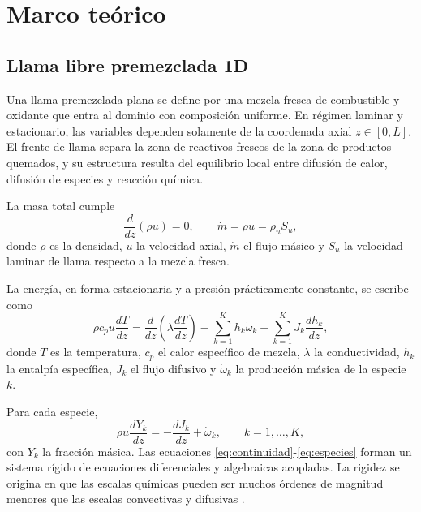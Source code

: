 \documentclass[12pt,a4paper]{article}
\begin{document}
\section{Marco teórico}

\subsection{Llama libre premezclada 1D}

Una llama premezclada plana se define por una mezcla fresca de combustible y oxidante que entra al dominio con composición uniforme. En régimen laminar y estacionario, las variables dependen solamente de la coordenada axial $z\in[0,L]$. El frente de llama separa la zona de reactivos frescos de la zona de productos quemados, y su estructura resulta del equilibrio local entre difusión de calor, difusión de especies y reacción química.

La masa total cumple
\begin{equation}
  \frac{d}{dz}(\rho u)=0,
  \qquad
  \dot{m}=\rho u=\rho_u S_u,
  \label{eq:continuidad}
\end{equation}
donde $\rho$ es la densidad, $u$ la velocidad axial, $\dot{m}$ el flujo másico y $S_u$ la velocidad laminar de llama respecto a la mezcla fresca.

La energía, en forma estacionaria y a presión prácticamente constante, se escribe como
\begin{equation}
  \rho c_p u \frac{dT}{dz}
  =
  \frac{d}{dz}\left(\lambda \frac{dT}{dz}\right)
  - \sum_{k=1}^{K} h_k \dot{\omega}_k
  - \sum_{k=1}^{K} J_k \frac{dh_k}{dz},
  \label{eq:energia}
\end{equation}
donde $T$ es la temperatura, $c_p$ el calor específico de mezcla, $\lambda$ la conductividad, $h_k$ la entalpía específica, $J_k$ el flujo difusivo y $\dot{\omega}_k$ la producción másica de la especie $k$.

Para cada especie,
\begin{equation}
  \rho u \frac{dY_k}{dz}
  =
  -\frac{dJ_k}{dz}+\dot{\omega}_k,
  \qquad k=1,\ldots,K,
  \label{eq:especies}
\end{equation}
con $Y_k$ la fracción másica. Las ecuaciones \eqref{eq:continuidad}-\eqref{eq:especies} forman un sistema rígido de ecuaciones diferenciales y algebraicas acopladas. La rigidez se origina en que las escalas químicas pueden ser muchos órdenes de magnitud menores que las escalas convectivas y difusivas \cite{PoinsotVeynante2005,Kee2017}.
\end{document}
